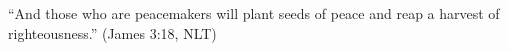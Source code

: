 \newpage
\thispagestyle{empty}
\vspace*{\fill}
\begin{flushright}
	``And those who are peacemakers will plant seeds of peace and reap a harvest of righteousness.'' (James 3:18, NLT)
\end{flushright}